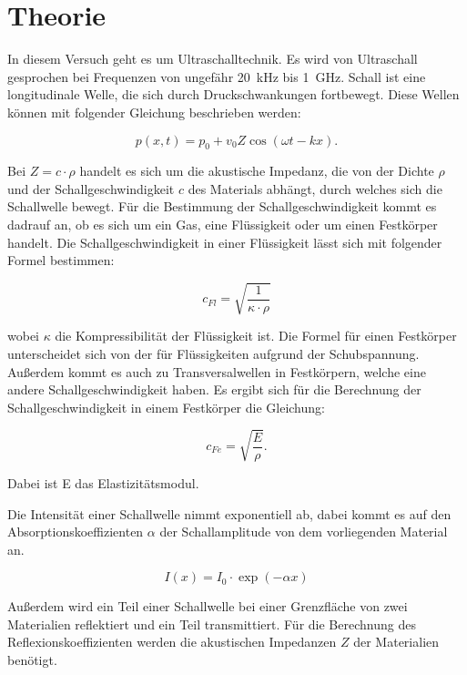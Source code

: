 \section{Theorie}

In diesem Versuch geht es um Ultraschalltechnik. Es wird von Ultraschall gesprochen
bei Frequenzen von ungefähr \SI{20}{\kilo\hertz} bis \SI{1}{\giga\hertz}. Schall ist
eine longitudinale Welle, die sich durch Druckschwankungen fortbewegt. Diese Wellen
können mit folgender Gleichung beschrieben werden:

\begin{equation*}
  p(x,t) = p_0 + v_0 Z \cos(\omega t - k x).
\end{equation*}

Bei $Z = c \cdot \rho$ handelt es sich um die akustische Impedanz, die von der
Dichte $\rho$ und der Schallgeschwindigkeit $c$ des Materials abhängt, durch welches
sich die Schallwelle bewegt. Für die Bestimmung der Schallgeschwindigkeit kommt es
dadrauf an, ob es sich um ein Gas, eine Flüssigkeit oder um einen Festkörper handelt.
Die Schallgeschwindigkeit in einer Flüssigkeit lässt sich mit folgender Formel bestimmen:

\begin{equation*}
  c_{Fl} = \sqrt{\frac{1}{\kappa \cdot \rho}}
\end{equation*}

wobei $\kappa$ die Kompressibilität der Flüssigkeit ist. Die Formel für einen Festkörper
unterscheidet sich von der für Flüssigkeiten aufgrund der Schubspannung. Außerdem kommt es
auch zu Transversalwellen in Festkörpern, welche eine andere Schallgeschwindigkeit haben.
Es ergibt sich für die Berechnung der Schallgeschwindigkeit in einem Festkörper die
Gleichung:

\begin{equation*}
  c_{Fe} = \sqrt{\frac{E}{\rho}}.
\end{equation*}

Dabei ist E das Elastizitätsmodul.

Die Intensität einer Schallwelle nimmt exponentiell ab, dabei kommt es auf den
Absorptionskoeffizienten $\alpha$ der Schallamplitude von dem vorliegenden Material an.

\begin{equation*}
  I (x) = I_0 \cdot \exp(-\alpha x)
\end{equation*}

Außerdem wird ein Teil einer Schallwelle bei einer Grenzfläche von zwei Materialien
reflektiert und ein Teil transmittiert. Für die Berechnung des Reflexionskoeffizienten
werden die akustischen Impedanzen $Z$ der Materialien benötigt.

